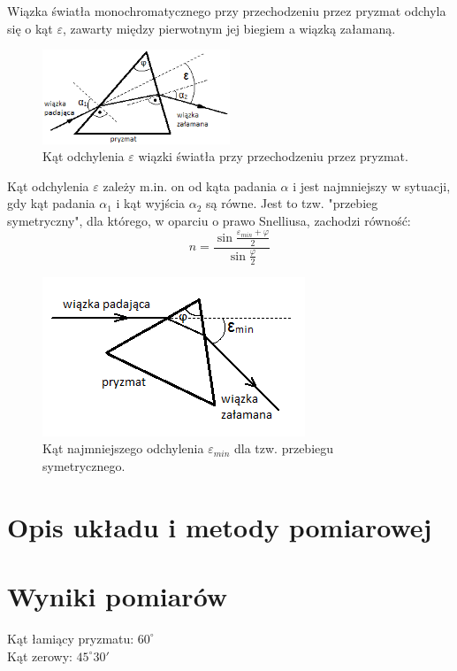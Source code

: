 \documentclass[a4paper,10pt]{article}
\begin{document}
Wiązka światła monochromatycznego przy przechodzeniu przez pryzmat odchyla się o kąt $\varepsilon$, zawarty między pierwotnym jej biegiem a wiązką załamaną. 
\begin{figure} [H]
  \centering
  \includegraphics[width=0.5\textwidth]{./epsilon.png}
  \caption{Kąt odchylenia $\varepsilon$ wiązki światła przy przechodzeniu przez pryzmat.}
  \label{}
\end{figure}

Kąt odchylenia $\varepsilon$ zależy m.in. on od kąta padania $\alpha$ i jest najmniejszy w sytuacji, gdy kąt padania $\alpha_1$ i kąt wyjścia $\alpha_2$ są równe. Jest to tzw. "przebieg symetryczny", dla którego, w oparciu o prawo Snelliusa, zachodzi równość:
\begin{equation}
n = \frac{\sin \frac{\varepsilon_{min}+\varphi}{2}}{\sin \frac{\varphi}{2}}
\end{equation}
\begin{figure} [H]
  \centering
  \includegraphics{./epsilon_min.png}
  \caption{Kąt najmniejszego odchylenia $\varepsilon_{min}$ dla tzw. przebiegu symetrycznego.}
  \label{}
\end{figure}

\section{Opis układu i metody pomiarowej}


\section{Wyniki pomiarów}
Kąt łamiący pryzmatu: $60^\circ$
\\Kąt zerowy: $45^\circ 30'$
\end{document}
